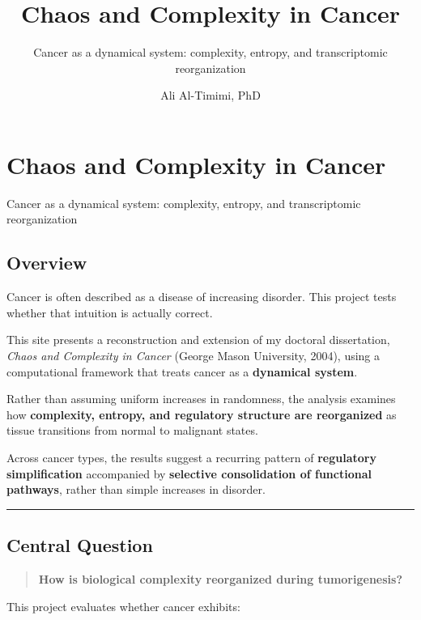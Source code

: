 \documentclass[
  letterpaper,
  DIV=11,
  numbers=noendperiod,
  openany,
  oneside]{scrreprt}
\title{Chaos and Complexity in Cancer}
\subtitle{Cancer as a dynamical system: complexity, entropy, and
transcriptomic reorganization}
\author{Ali Al-Timimi, PhD}
\date{}
\begin{document}
\maketitle



\chapter{Chaos and Complexity in
Cancer}\label{chaos-and-complexity-in-cancer}

Cancer as a dynamical system: complexity, entropy, and transcriptomic
reorganization

\hfill\break

\section{Overview}\label{overview}

Cancer is often described as a disease of increasing disorder. This
project tests whether that intuition is actually correct.

This site presents a reconstruction and extension of my doctoral
dissertation, \emph{Chaos and Complexity in Cancer} (George Mason
University, 2004), using a computational framework that treats cancer as
a \textbf{dynamical system}.

Rather than assuming uniform increases in randomness, the analysis
examines how \textbf{complexity, entropy, and regulatory structure are
reorganized} as tissue transitions from normal to malignant states.

Across cancer types, the results suggest a recurring pattern of
\textbf{regulatory simplification} accompanied by \textbf{selective
consolidation of functional pathways}, rather than simple increases in
disorder.

\begin{center}\rule{0.5\linewidth}{0.5pt}\end{center}

\section{Central Question}\label{central-question}

\begin{quote}
\textbf{How is biological complexity reorganized during tumorigenesis?}
\end{quote}

This project evaluates whether cancer exhibits:
\end{document}

